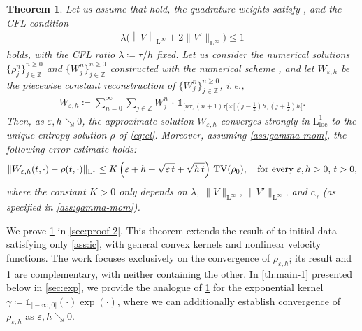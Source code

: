 \documentclass[10pt]{amsart}
\theoremstyle{plain}
\newtheorem{theorem}[lemma]{Theorem}
\theoremstyle{definition}
\numberwithin{equation}{section}
\newcommand{\eps}{{\varepsilon}}
\newcommand{\norm}[1]{\left\lVert#1\right\rVert}
\begin{document}
\begin{theorem} \label{th:main-2} 
Let us assume that  hold, the quadrature weights satisfy , and the CFL condition 
\begin{align}\label{ass:CFL}
   \lambda \Big(\norm{V}_{\mathrm{L}^\infty}+2\|V'\|_{\mathrm{L}^\infty}\Big) \leq 1
\end{align}
holds, with the CFL ratio $\lambda\coloneqq \tau/h$ fixed. Let us consider the numerical solutions $\{\rho_j^n\}_{j\in\mathbb{Z}}^{n\geq0}$ and $\{W_j^n\}_{j\in\mathbb{Z}}^{n\geq0}$ constructed with the numerical scheme , and let $W_{\eps,h}$ be the piecewise constant reconstruction of $\{W_j^n\}_{j\in\mathbb{Z}}^{n\geq0}$, i.\,e., 
\begin{align}\label{eq:W_piece_recon}
    W_{\eps,h} \coloneqq \sum_{n=0}^\infty \sum_{j\in\mathbb{Z}} W_j^n \,\cdot\, \mathds{1}_{[n\tau,(n+1)\tau[\times[(j-\frac12)h,(j+\frac12)h[}.
\end{align}
Then, as $\eps,h\searrow 0$, the approximate solution $W_{\eps,h}$ converges strongly in $\mathrm{L}^1_{\mathrm{loc}}$ to the unique entropy solution $\rho$ of \cref{eq:cl}. 
Moreover, assuming \cref{ass:gamma-mom}, the following error estimate holds: 
\begin{align}\label{eq:rate-thm}
\|W_{\eps,h}(t,\cdot)-\rho(t,\cdot)\|_{\mathrm{L}^1} \leq K\left( \eps+h+\sqrt{\eps\, t}+\sqrt{h\,t} \right)\, \mathrm{TV}(\rho_0), \quad \textnormal{for every } \eps,h > 0, \, t > 0,
\end{align}
where the constant $K>0$ only depends on $\lambda$, $\|V\|_{\mathrm{L}^\infty}$, $\|V'\|_{\mathrm{L}^\infty}$, and $c_\gamma$ (as specified in \cref{ass:gamma-mom}).
\end{theorem}

We prove \cref{th:main-2} in \cref{sec:proof-2}. This theorem extends the result of \cite{MR4742183} to initial data satisfying only \cref{ass:ic}, with general convex kernels and nonlinear velocity functions. The work \cite{MR4742183} focuses exclusively on the convergence of $\rho_{\varepsilon,h}$; its result and \cref{th:main-2} are complementary, with neither containing the other. In \cref{th:main-1} presented below in \cref{sec:exp}, we provide the analogue of \cref{th:main-2} for the exponential kernel $\gamma \coloneqq \mathds{1}_{]-\infty,0]}(\cdot)\exp(\cdot)$, where we can additionally establish convergence of $\rho_{\varepsilon,h}$ as $\varepsilon,h \searrow 0$.
\end{document}
